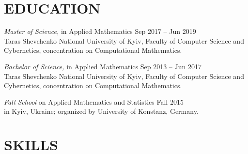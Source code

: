 \documentclass[margin, 10pt]{res} %
\begin{document}
\begin{resume}

 



\section{EDUCATION}

{\textit{Master of Science,} in Applied Mathematics \hfill Sep 2017 -- Jun 2019}\\
Taras Shevchenko National University of Kyiv, Faculty of Computer Science and Cybernetics, concentration on Computational Mathematics.
\\
\vspace*{-1.6\baselineskip}\leavevmode

{\textit{Bachelor of Science,} in Applied Mathematics \hfill Sep 2013 -- Jun 2017}\\
Taras Shevchenko National University of Kyiv, Faculty of Computer Science and Cybernetics, concentration on Computational Mathematics.
\\
\vspace*{-1.6\baselineskip}\leavevmode

{\textit{Fall School} on Applied Mathematics and Statistics \hfill Fall 2015}\\
in Kyiv, Ukraine; organized by University of Konstanz, Germany.
 
 
\section{SKILLS}


\end{resume}
\end{document}
